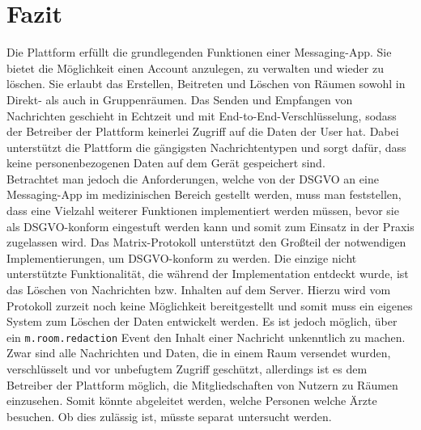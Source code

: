     \chapter{Fazit}\label{ch:fazit}
    Die Plattform erfüllt die grundlegenden Funktionen einer Messaging-App.
    Sie bietet die Möglichkeit einen Account anzulegen, zu verwalten und wieder zu löschen.
    Sie erlaubt das Erstellen, Beitreten und Löschen von Räumen sowohl in Direkt- als auch in Gruppenräumen.
    Das Senden und Empfangen von Nachrichten geschieht in Echtzeit und mit End-to-End-Verschlüsselung, sodass der Betreiber der Plattform keinerlei Zugriff auf die Daten der User hat.
    Dabei unterstützt die Plattform die gängigsten Nachrichtentypen und sorgt dafür, dass keine personenbezogenen Daten auf dem Gerät gespeichert sind.\\
    Betrachtet man jedoch die Anforderungen, welche von der DSGVO an eine Messaging-App im medizinischen Bereich gestellt werden, muss man feststellen, dass eine Vielzahl weiterer Funktionen implementiert werden müssen, bevor sie als DSGVO-konform eingestuft werden kann und somit zum Einsatz in der Praxis zugelassen wird.
    Das Matrix-Protokoll unterstützt den Großteil der notwendigen Implementierungen, um DSGVO-konform zu werden.
    Die einzige nicht unterstützte Funktionalität, die während der Implementation entdeckt wurde, ist das Löschen von Nachrichten bzw. Inhalten auf dem Server.
    Hierzu wird vom Protokoll zurzeit noch keine Möglichkeit bereitgestellt und somit muss ein eigenes System zum Löschen der Daten entwickelt werden.
    Es ist jedoch möglich, über ein \texttt{m.room.redaction} Event den Inhalt einer Nachricht unkenntlich zu machen.\\
    Zwar sind alle Nachrichten und Daten, die in einem Raum versendet wurden, verschlüsselt und vor unbefugtem Zugriff geschützt, allerdings ist es dem Betreiber der Plattform möglich, die Mitgliedschaften von Nutzern zu Räumen einzusehen.
    Somit könnte abgeleitet werden, welche Personen welche Ärzte besuchen.
    Ob dies zulässig ist, müsste separat untersucht werden.


